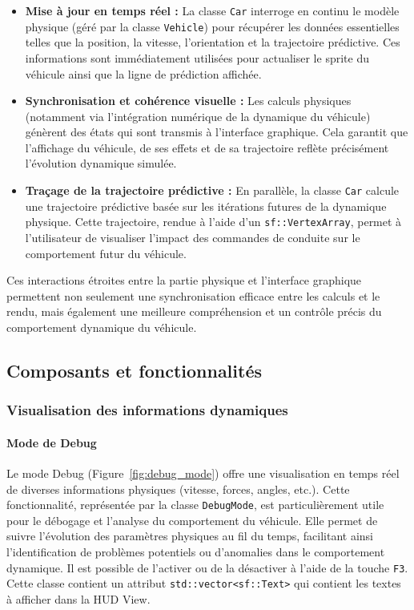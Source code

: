 \begin{itemize}
    \item \textbf{Mise à jour en temps réel :} La classe \texttt{Car} interroge en continu le modèle physique (géré par la classe \texttt{Vehicle}) pour récupérer les données essentielles telles que la position, la vitesse, l'orientation et la trajectoire prédictive.
    Ces informations sont immédiatement utilisées pour actualiser le \gls{sprite} du véhicule ainsi que la ligne de prédiction affichée.
    \item \textbf{Synchronisation et cohérence visuelle :} Les calculs physiques (notamment via l'intégration numérique de la dynamique du véhicule) génèrent des états qui sont transmis à l'interface graphique.
    Cela garantit que l'affichage du véhicule, de ses effets et de sa trajectoire reflète précisément l'évolution dynamique simulée.
    \item \textbf{Traçage de la trajectoire prédictive :} En parallèle, la classe \texttt{Car} calcule une trajectoire prédictive basée sur les itérations futures de la dynamique physique.
    Cette trajectoire, rendue à l'aide d'un \texttt{sf::VertexArray}\cite{sfml_sf_vertexarray}, permet à l'utilisateur de visualiser l'impact des commandes de conduite sur le comportement futur du véhicule.
\end{itemize}

Ces interactions étroites entre la partie physique et l'interface graphique permettent non seulement une synchronisation efficace entre les calculs et le rendu, mais également une meilleure compréhension et un contrôle précis du comportement dynamique du véhicule.


\subsection{Composants et fonctionnalités}\label{subsec:composants-et-fonctionnalites}

\subsubsection{Visualisation des informations dynamiques}\label{subsubsec:visualisation-des-informations-dynamiques}

\paragraph{Mode de Debug}
Le mode Debug (Figure~\ref{fig:debug_mode}) offre une visualisation en temps réel de diverses informations physiques (vitesse, forces, angles, etc.).
Cette fonctionnalité, représentée par la classe \texttt{DebugMode}, est particulièrement utile pour le débogage et l'analyse du comportement du véhicule.
Elle permet de suivre l'évolution des paramètres physiques au fil du temps, facilitant ainsi l'identification de problèmes potentiels ou d'anomalies dans le comportement dynamique.
Il est possible de l'activer ou de la désactiver à l'aide de la touche \texttt{F3}.
Cette classe contient un attribut \texttt{std::vector<sf::Text>}\cite{cpp_reference_vector} qui contient les textes à afficher dans la HUD View.

